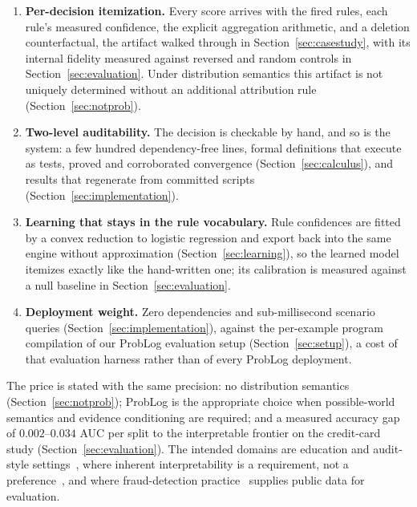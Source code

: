 \begin{enumerate}
\item \textbf{Per-decision itemization.} Every score arrives with the
  fired rules, each rule's measured confidence, the explicit
  aggregation arithmetic, and a deletion counterfactual, the
  artifact walked through in Section~\ref{sec:casestudy}, with its
  internal fidelity measured against reversed and random controls in
  Section~\ref{sec:evaluation}. Under distribution semantics this
  artifact is not uniquely determined without an additional
  attribution rule (Section~\ref{sec:notprob}).
\item \textbf{Two-level auditability.} The decision is checkable by
  hand, and so is the system: a few hundred dependency-free lines,
  formal definitions that execute as tests, proved and corroborated
  convergence (Section~\ref{sec:calculus}), and results that
  regenerate from committed scripts (Section~\ref{sec:implementation}).
\item \textbf{Learning that stays in the rule vocabulary.} Rule
  confidences are fitted by a convex reduction to logistic regression
  and export back into the same engine without approximation
  (Section~\ref{sec:learning}), so the learned model itemizes exactly
  like the hand-written one; its calibration is measured against a
  null baseline in Section~\ref{sec:evaluation}.
\item \textbf{Deployment weight.} Zero dependencies and
  sub-millisecond scenario queries (Section~\ref{sec:implementation}),
  against the per-example program compilation of our ProbLog
  evaluation setup (Section~\ref{sec:setup}), a cost of that
  evaluation harness rather than of every ProbLog deployment.
\end{enumerate}

The price is stated with the same precision: no distribution
semantics (Section~\ref{sec:notprob}); ProbLog is the appropriate
choice when possible-world semantics and evidence conditioning are
required; and a measured accuracy gap of $0.002$--$0.034$ AUC
per split to the interpretable frontier on the credit-card study
(Section~\ref{sec:evaluation}). The intended domains are education and
audit-style settings~\cite{appelbaum2017}, where inherent
interpretability is a requirement, not a
preference~\cite{rudin2019,jacovi2020}, and where fraud-detection
practice~\cite{west2016,dalpozzolo2015,bao2020} supplies public data
for evaluation.
